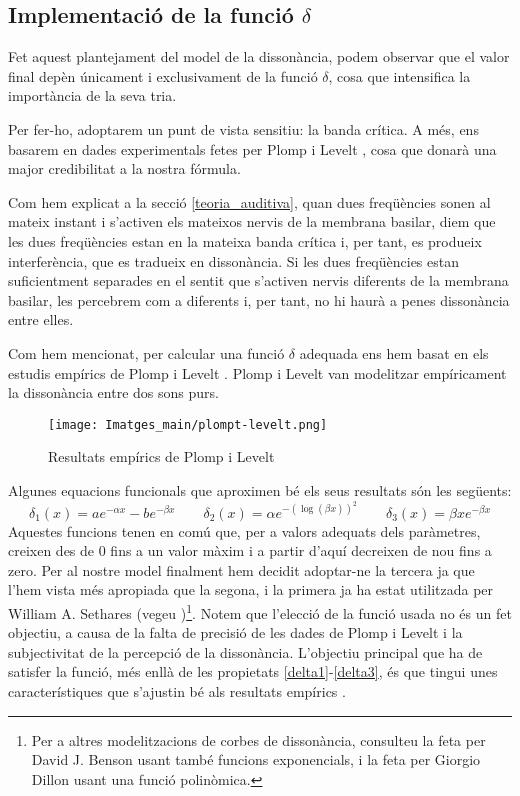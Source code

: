 \documentclass{article}
\theoremstyle{math}
\theoremstyle{TheoremNum}
\newcommand{\0}{\ensuremath{\vb{0}}}
\begin{document}
\subsection{Implementació de la funció \texorpdfstring{$\delta$}{delta}}
Fet aquest plantejament del model de la dissonància, podem observar que el valor final depèn únicament i exclusivament de la funció $\delta$, cosa que intensifica la importància de la seva tria.\par
Per fer-ho, adoptarem un punt de vista sensitiu: la banda crítica. A més, ens basarem en dades experimentals fetes per Plomp i Levelt \cite{plomp}, cosa que donarà una major credibilitat a la nostra fórmula.\par Com hem explicat a la secció \ref{teoria_auditiva}, quan dues freqüències sonen al mateix instant i s'activen els mateixos nervis de la membrana basilar, diem que les dues freqüències estan en la mateixa banda crítica i, per tant, es produeix interferència, que es tradueix en dissonància. Si les dues freqüències estan suficientment separades en el sentit que s'activen nervis diferents de la membrana basilar, les percebrem com a diferents i, per tant, no hi haurà a penes dissonància entre elles.\par
Com hem mencionat, per calcular una funció $\delta$ adequada ens hem basat en els estudis empírics de Plomp i Levelt \cite{plomp}. Plomp i Levelt van modelitzar empíricament la dissonància entre dos sons purs.
\begin{figure}[ht]
  \centering
  \texttt{[image: Imatges\_main/plompt-levelt.png]}
  \caption{Resultats empírics de Plomp i Levelt \cite{plomp}}
  \label{fig_plomp}
\end{figure}\par
\noindent Algunes equacions funcionals que aproximen bé els seus resultats són les següents: $$\delta_1(x)=ae^{-\alpha x}-be^{-\beta x}\qquad\delta_2(x)=\alpha e^{-\left(\log(\beta x)\right)^2}\qquad\delta_3(x)=\beta xe^{-\beta x}$$
Aquestes funcions tenen en comú que, per a valors adequats dels paràmetres, creixen des de 0 fins a un valor màxim i a partir d'aquí decreixen de nou fins a zero. Per al nostre model finalment hem decidit adoptar-ne la tercera ja que l'hem vista més apropiada que la segona, i la primera ja ha estat utilitzada per William A. Sethares (vegeu \cite{sethares1})\footnote{Per a altres modelitzacions de corbes de dissonància, consulteu la feta per David J. Benson \cite{benson} usant també funcions exponencials, i la feta per Giorgio Dillon \cite{dillon} usant una funció polinòmica.}. Notem que l'elecció de la funció usada no és un fet objectiu, a causa de la falta de precisió de les dades de Plomp i Levelt i la subjectivitat de la percepció de la dissonància. L'objectiu principal que ha de satisfer la funció, més enllà de les propietats \ref{delta1}-\ref{delta3}, és que tingui unes característiques que s'ajustin bé als resultats empírics \cite{benson}.\par
\end{document}
